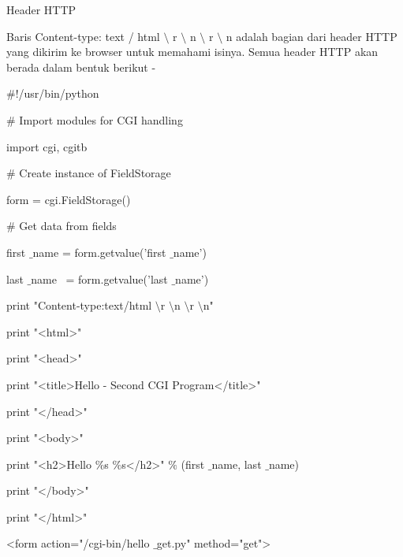 \begin{12pt}
\begin{12pt}
\begin{12pt}
\begin{12pt}
\begin{12pt}
\begin{12pt}
\begin{12pt}
\vspace{12pt}
\vspace{12pt}
\vspace{12pt}
\vspace{12pt}
\noindent 
Header HTTP \par
\vspace{12pt}
\noindent 
Baris Content-type: text / html  $  \setminus  $ r  $  \setminus  $ n  $  \setminus  $ r  $  \setminus  $ n adalah bagian dari header HTTP yang dikirim ke browser untuk memahami isinya. Semua header HTTP akan berada dalam bentuk berikut - \par
\noindent 
 $  \#  $!/usr/bin/python \par
\vspace{12pt}
\noindent 
 $  \#  $ Import modules for CGI handling  \par
\noindent 
import cgi, cgitb  \par
\vspace{12pt}
\noindent 
 $  \#  $ Create instance of FieldStorage  \par
\noindent 
form = cgi.FieldStorage()  \par
\vspace{12pt}
\noindent 
   \#   Get data from fields \par
\noindent 
first $  \_  $name = form.getvalue('first $  \_  $name') \par
\noindent 
last $  \_  $name~ = form.getvalue('last $  \_  $name') \par
\vspace{12pt}
\noindent 
print "Content-type:text/html $  \setminus  $r $  \setminus  $n $  \setminus  $r $  \setminus  $n" \par
\noindent 
print "<html>" \par
\noindent 
print "<head>" \par
\noindent 
print "<title>Hello - Second CGI Program</title>" \par
\noindent 
print "</head>" \par
\noindent 
print "<body>" \par
\noindent 
print "<h2>Hello  $  \%  $s  $  \%  $s</h2>"  $  \%  $ (first $  \_  $name, last $  \_  $name) \par
\noindent 
print "</body>" \par
\noindent 
print "</html>" \par
\vspace{12pt}
\noindent 
<form action="/cgi-bin/hello $  \_  $get.py" method="get"> \par

\end{12pt}
\end{12pt}
\end{12pt}
\end{12pt}
\end{12pt}
\end{12pt}
\end{12pt}
